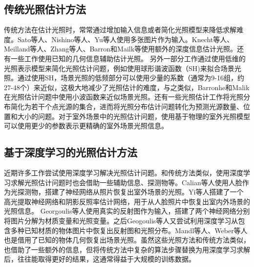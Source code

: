 \subsection{传统光照估计方法}
传统方法在估计光照时，常常通过增加输入信息或者简化光照模型来降低求解难度。Sato等人\cite{sato1999acquiring}、Nishino\cite{nishino2001determining}等人、Yu\cite{yu2006sparse}等人使用多张图片作为输入。Knecht\cite{knecht2012reciprocal}等人、Meilland\cite{meilland20133d}等人、Zhang等人\cite{zhang2016emptying}、Barron和Mailk\cite{barron2013intrinsic}等使用额外的深度信息估计光照。还有一些工作使用已知的几何信息辅助估计光照\cite{ramamoorthi2001signal, sato2003illumination, li2003multiple}。
另外一部分工作通过使用低维的光照表示模型来简化光照估计问题，例如使用球形谐波函数（SH)来拟合场景光照\cite{ramamoorthi2001signal,kemelmacher20113d,garrido2013reconstructing,
knorr2014real,li2014intrinsic,barron2015shape, rematas2016deep}。通过使用SH，场景光照的低频部分可以使用少量的系数（通常为9-16组，约27-48个）来近似，这极大地减少了光照估计的难度，与之类似，Barronhe和Malik\cite{okabe2004spherical}在光照估计问题中使用小波函数来近似场景光照。还有一些光照估计工作\cite{sato1999acquiring,  panagopoulos2011illumination, wang2002estimation, li2003multiple, sato2003illumination}将光照分布简化为若干个点光源的集合，进而将光照分布估计问题转化为预测光源数量、位置和大小的问题。对于室外场景中的光照估计问题，使用基于物理的室外光照模型\cite{lalonde2008does, lalonde2010sun, lalonde2012estimating, sunkavalli2008color}可以使用更少的参数表示更精确的室外场景光照信息。
\subsection{基于深度学习的光照估计方法}

近期许多工作尝试使用深度学习解决光照估计问题。和传统方法类似，使用深度学习求解光照估计问题时也会借助一些辅助信息、探测物等。Calian等人\cite{calian2018faces}使用人脸作为光探测物，搭建了神经网络从照片恢复出室外场景的光照。Yi等人\cite{yi2018faces}搭建了一个高光提取神经网络和阴影反照率估计网络，用于从人脸照片中恢复出室内外场景的光照信息。
Georgoulis等人\cite{georgoulis2016delight}使用真实的反射图作为输入，搭建了两个神经网络分别将图片分解为材质变量和光照变量。之后Geogoulis等人\cite{georgoulis2016natural}又尝试利用深度学习从包含多种已知材质的物体图片中恢复出反射图和光照分布。Mandl等人\cite{mandl2017learning}、Weber等人\cite{weber2018learning}也是借用了已知的物体几何恢复出场景光照。虽然这些光照方法和传统方法类似，也借助了一些额外的信息，但将传统方法中复杂的算法步骤替换为用深度学习求解后，往往能取得更好的结果，这通常得益于大规模的训练数据。

